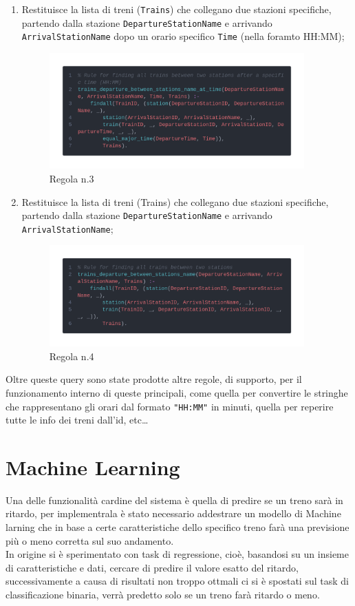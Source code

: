\documentclass[italian,12pt,a4paper]{article}
\begin{document}
\begin{enumerate}
\begin{figure}[h]
			\end{figure}
			\newpage
		\item Restituisce la lista di treni (\texttt{Trains}) che collegano due stazioni specifiche, partendo dalla stazione \texttt{DepartureStationName} e arrivando \texttt{ArrivalStationName} dopo un orario specifico \texttt{Time} (nella foramto HH:MM);
			\begin{figure}[h]
				\centering
				\includegraphics[width=370px]{img/code4}
				\caption{Regola n.3}

			\end{figure}
		\item Restituisce la lista di treni (Trains) che collegano due stazioni specifiche, partendo dalla stazione \texttt{DepartureStationName} e arrivando \texttt{ArrivalStationName};
			\begin{figure}[h]
				\centering
				\includegraphics[width=370px]{img/code3}
				\caption{Regola n.4}

			\end{figure}

				
	\end{enumerate}
	
	
	Oltre queste query sono state prodotte altre regole, di supporto, per il funzionamento interno di queste principali, come quella per convertire le stringhe che rappresentano gli orari dal formato \texttt{"HH:MM"} in minuti, quella per reperire tutte le info dei treni dall'id, etc\dots

	\section{Machine Learning}
		Una delle funzionalità cardine del sistema è quella di predire se un treno sarà in ritardo, per implementrala è stato necessario addestrare un modello di Machine larning che in base a certe caratteristiche dello specifico treno farà una previsione più o meno corretta sul suo andamento. \\
		\linebreak
		In origine si è sperimentato con task di regressione, cioè, basandosi su un insieme di caratteristiche e dati, cercare di predire il valore esatto del ritardo, successivamente a causa di risultati non troppo ottmali ci si è spostati sul task di classificazione binaria, verrà predetto solo se un treno farà ritardo o meno.
	
\end{document}
